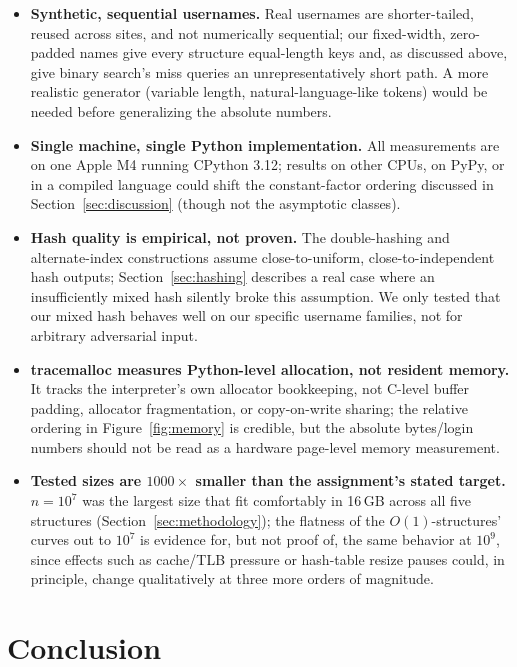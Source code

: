 \documentclass[acmsmall,screen,nonacm=true]{acmart}
\begin{document}
\begin{itemize}
  \item \textbf{Synthetic, sequential usernames.} Real usernames are
    shorter-tailed, reused across sites, and not numerically sequential;
    our fixed-width, zero-padded names give every structure equal-length
    keys and, as discussed above, give binary search's miss queries an
    unrepresentatively short path. A more realistic generator (variable
    length, natural-language-like tokens) would be needed before
    generalizing the absolute numbers.
  \item \textbf{Single machine, single Python implementation.} All
    measurements are on one Apple M4 running CPython 3.12; results on
    other CPUs, on PyPy, or in a compiled language could shift the
    constant-factor ordering discussed in Section~\ref{sec:discussion}
    (though not the asymptotic classes).
  \item \textbf{Hash quality is empirical, not proven.} The double-hashing
    and alternate-index constructions assume close-to-uniform,
    close-to-independent hash outputs; Section~\ref{sec:hashing} describes
    a real case where an insufficiently mixed hash silently broke this
    assumption. We only tested that our mixed hash behaves well on our
    specific username families, not for arbitrary adversarial input.
  \item \textbf{tracemalloc measures Python-level allocation, not resident
    memory.} It tracks the interpreter's own allocator bookkeeping, not
    C-level buffer padding, allocator fragmentation, or copy-on-write
    sharing; the relative ordering in Figure~\ref{fig:memory} is credible,
    but the absolute bytes/login numbers should not be read as
    a hardware page-level memory measurement.
  \item \textbf{Tested sizes are $1000\times$ smaller than the assignment's
    stated target.} $n=10^7$ was the largest size that fit comfortably in
    16\,GB across all five structures (Section~\ref{sec:methodology}); the
    flatness of the $O(1)$-structures' curves out to $10^7$ is evidence for,
    but not proof of, the same behavior at $10^9$, since effects such as
    cache/TLB pressure or hash-table resize pauses could, in principle,
    change qualitatively at three more orders of magnitude.
\end{itemize}

\section{Conclusion}
\end{document}
